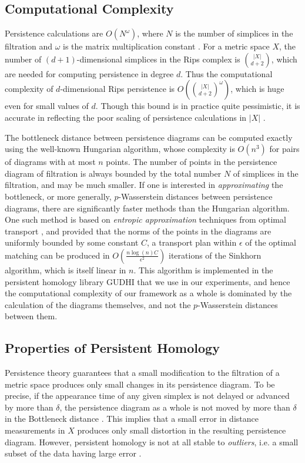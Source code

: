 \documentclass[conference]{IEEEtran}
\theoremstyle{definition}
\numberwithin{figure}{section}
\begin{document}
\subsection{Computational Complexity}
Persistence calculations are $O(N^{\omega})$, where $N$ is the number of simplices in the filtration and $\omega$ is the matrix multiplication constant \cite{milosavljevic2011zigzag}. For a metric space $X$, the number of $(d+1)$-dimensional simplices in the Rips complex is ${|X| \choose d+2}$, which are needed for computing persistence in degree $d$. Thus the computational complexity of $d$-dimensional Rips persistence is $O({|X| \choose d+2}^{\omega})$, which is huge even for small values of $d$. Though this bound is in practice quite pessimistic, it is accurate in reflecting the poor scaling of persistence calculations in $|X|$ \cite{otter2017roadmap}.

The bottleneck distance between persistence diagrams can be computed exactly using the well-known Hungarian algorithm, whose complexity is $O(n^3)$ for pairs of diagrams with at most $n$ points. The number of points in the persistence diagram of filtration is always bounded by the total number $N$ of simplices in the filtration, and may be much smaller. If one is interested in \emph{approximating} the bottleneck, or more generally, $p$-Wasserstein distances between persistence diagrams, there are significantly faster methods than the Hungarian algorithm. One such method is based on \emph{entropic approximation} techniques from optimal transport \cite{lacombe2018large}, and provided that the norms of the points in the diagrams are uniformly bounded by some constant $C$, a transport plan within $\epsilon$ of the optimal matching can be produced in $O(\frac{n \log(n) C}{\epsilon^2})$ iterations of the Sinkhorn algorithm, which is itself linear in $n$. This algorithm is implemented in the persistent homology library GUDHI that we use in our experiments, and hence the computational complexity of our framework as a whole is dominated by the calculation of the diagrams themselves, and not the $p$-Wasserstein distances between them.

\subsection{Properties of Persistent Homology}
\label{subsec:persprop}
Persistence theory guarantees that a small modification to the filtration of a metric space produces only small changes in its persistence diagram. To be precise, if the appearance time of any given simplex is not delayed or advanced by more than $\delta$, the persistence diagram as a whole is not moved by more than $\delta$ in the Bottleneck distance \cite{cohen2007stability}. This implies that a small error in distance measurements in $X$ produces only small distortion in the resulting persistence diagram. However, persistent homology is not at all stable to \emph{outliers}, i.e. a small subset of the data having large error \cite{buchet2014topological}. 
\end{document}
